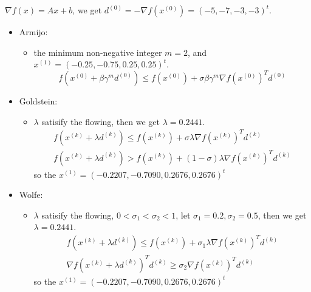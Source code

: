 \begin{problem}
    \Answer $\nabla f(x) = Ax + b$, we get $d^{(0)} = -\nabla f(x^{(0)}) = (-5, -7, -3, -3)^t$.
    \begin{itemize}
        \item Armijo:\begin{itemize}
            \item the minimum non-negative integer $m = 2$, and $x^{(1)} = (-0.25, -0.75, 0.25, 0.25)^t$. \[f\left(x^{(0)}+\beta \gamma^{m} d^{(0)}\right) \leq f\left(x^{(0)}\right)+\sigma \beta \gamma^{m} \nabla f\left(x^{(0)}\right)^{T} d^{(0)}\]
        \end{itemize}
        \item Goldstein:\begin{itemize}
            \item $\lambda$ satisify the flowing, then we get $\lambda = 0.2441$. \begin{gather*}
                f\left(x^{(k)}+\lambda d^{(k)}\right) \leq f\left(x^{(k)}\right)+\sigma \lambda \nabla f\left(x^{(k)}\right)^{T} d^{(k)} \\
                f\left(x^{(k)}+\lambda d^{(k)}\right)>f\left(x^{(k)}\right)+(1-\sigma) \lambda \nabla f\left(x^{(k)}\right)^{T} d^{(k)}
            \end{gather*}
            so the $x^{(1)} = (-0.2207, -0.7090, 0.2676, 0.2676)^t$
        \end{itemize}
        \item Wolfe:\begin{itemize}
            \item $\lambda$ satisify the flowing, $0 < \sigma_1 < \sigma_2 < 1$, let $\sigma_1 = 0.2, \sigma_2 = 0.5$, then we get $\lambda = 0.2441$. \begin{gather*}
                f\left(x^{(k)}+\lambda d^{(k)}\right) \leq f\left(x^{(k)}\right)+\sigma_{1} \lambda \nabla f\left(x^{(k)}\right)^{T} d^{(k)} \\
                \nabla f\left(x^{(k)}+\lambda d^{(k)}\right)^{T} d^{(k)} \geq \sigma_{2} \nabla f\left(x^{(k)}\right)^{T} d^{(k)}
            \end{gather*}
            so the $x^{(1)} = (-0.2207, -0.7090, 0.2676, 0.2676)^t$
        \end{itemize}
    \end{itemize}
\end{problem}

